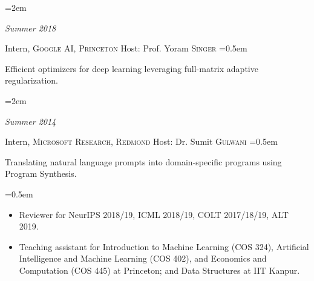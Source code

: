 \documentclass{scrartcl}
\newlength{\datebox}\settowidth{\datebox}{Spring 2011} %
\newcommand{\NewEntry}[3]{\noindent\hangindent=2em\hangafter=0 \parbox{\datebox}{\small \textit{#1}}\hspace{1.5em} #2 #3 %
\vspace{0.5em}} %
\newcommand{\Description}[1]{\hangindent=0.5em\hangafter=0\noindent\raggedright\footnotesize{#1}\par\normalsize\vspace{1em}} %
\begin{document}
\begin{cv}{}
\NewEntry{Summer 2018}{Intern, \textsc{\color{Maroon} Google AI, Princeton} \hfill {\footnotesize Host: Prof. Yoram \textsc{Singer}}}

\vspace{-0.4em}\hspace{1em}
\Description{Efficient optimizers for deep learning leveraging full-matrix adaptive regularization.}
\vspace{-0.5em}
\NewEntry{Summer 2014}{Intern, \textsc{\color{Maroon} Microsoft Research, Redmond} \hfill {\footnotesize Host: Dr. Sumit \textsc{Gulwani}}}

\vspace{-0.4em}\hspace{1em}
\Description{Translating natural language prompts into domain-specific programs using Program Synthesis.}



\noindent{}

\Description{
\begin{itemize}
\item[\Forward] Reviewer for NeurIPS 2018/19, ICML 2018/19, COLT 2017/18/19, ALT 2019.
\item[\Forward] Teaching assistant for Introduction to Machine Learning (COS 324), Artificial Intelligence and Machine Learning (COS 402), and Economics and Computation
(COS 445) at Princeton; and Data Structures at IIT Kanpur.
\end{itemize}
}

\end{cv}
\end{document}
